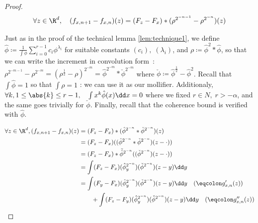 \begin{proof}
\begin{equation*}
    \forall z\in \R^d, \quad (f_{x,n+1} - f_{x,n})(z) = (F_z - F_x)* (\rho^{2^{-n - 1}} - \rho^{2^{-n}})(z)
\end{equation*}

Just as in the proof of the technical lemma \ref{lem:technique1}, 
we define $\hat{\phi} \coloneq \frac{1}{\int \phi} \sum_{i=0}^{r-1} c_i \phi^{\lambda_i}$ for suitable constants $(c_i),\;(\lambda_i)$, and $\rho \coloneq \hat{\phi}^2*\hat{\phi}$, so that we can write the increment in convolution form~: $\rho^{2^{-m-1}} - \rho^{2^{-m}} = (\rho^{\frac{1}{2}} - \rho)^{2^{-m}} = \hat{\phi}^{2^{-m}}*\check{\phi}^{2^{-m}}$ where $\check{\phi}\coloneq \hat{\phi}^{\frac{1}{2}} - \hat{\phi}^2$.
Recall that $\int \hat{\phi} = 1$ so that $\int \rho = 1$ : we can use it as our mollifier.
Additionaly, $\forall k, 1\leq \abs{k}\leq r-1, \quad \int x^k \hat{\phi}(x) \dd x = 0$ where we fixed $r\in N, \; r>-\alpha$, and the same goes trivially for $\check{\phi}$.
Finally, recall that the coherence bound is verified with $\hat{\phi}$.

\begin{align*}
    \forall z\in \R^d, (f_{x,n+1} - f_{x,n})(z) &= (F_z - F_x)*(\hat{\phi}^{2^{-n}}*\check{\phi}^{2^{-n}})(z)\\
    &= (F_z - F_x)((\hat{\phi}^{2^{-n}}*\check{\phi}^{2^{-n}})(z-\cdot)) \\
    &= (F_z - F_x)*\tilde{\hat{\phi}}^{2^{-n}} ((\check{\phi}^{2^{-n}})(z-\cdot)) \\
    &= \int (F_z - F_x)(\hat{\phi}^{2^{-n}}_y) (\check{\phi}^{2^{-n}})(z-y) \dd y \\
    &= \int (F_y - F_x)(\hat{\phi}^{2^{-n}}_y) (\check{\phi}^{2^{-n}})(z-y) \dd y  \quad (\eqcolon g'_{x,n}(z))\\
    & \quad \quad  + \int (F_z - F_y)(\hat{\phi}^{2^{-n}}_y) (\check{\phi}^{2^{-n}})(z-y) \dd y \quad (\eqcolon g''_{x,n}(z))\\
\end{align*}


\end{proof}
